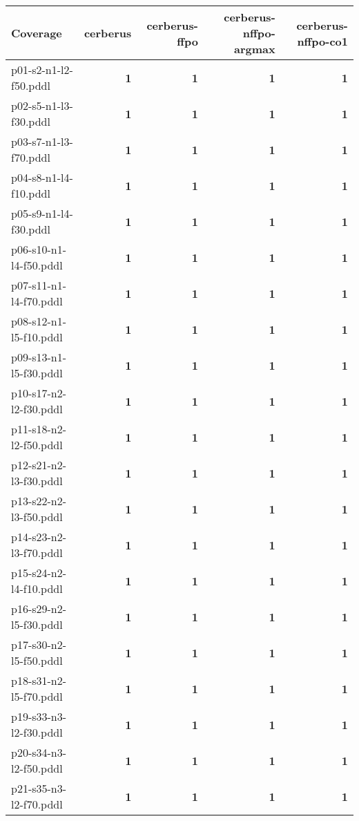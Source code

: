 \documentclass{article}
\begin{document}
\begin{tabular}{@{}lrrrr@{}}
Coverage & cerberus & cerberus-ffpo & cerberus-nffpo-argmax & cerberus-nffpo-co1 \\
\midrule
p01-s2-n1-l2-f50.pddl & \textbf{1} & \textbf{1} & \textbf{1} & \textbf{1} \\
p02-s5-n1-l3-f30.pddl & \textbf{1} & \textbf{1} & \textbf{1} & \textbf{1} \\
p03-s7-n1-l3-f70.pddl & \textbf{1} & \textbf{1} & \textbf{1} & \textbf{1} \\
p04-s8-n1-l4-f10.pddl & \textbf{1} & \textbf{1} & \textbf{1} & \textbf{1} \\
p05-s9-n1-l4-f30.pddl & \textbf{1} & \textbf{1} & \textbf{1} & \textbf{1} \\
p06-s10-n1-l4-f50.pddl & \textbf{1} & \textbf{1} & \textbf{1} & \textbf{1} \\
p07-s11-n1-l4-f70.pddl & \textbf{1} & \textbf{1} & \textbf{1} & \textbf{1} \\
p08-s12-n1-l5-f10.pddl & \textbf{1} & \textbf{1} & \textbf{1} & \textbf{1} \\
p09-s13-n1-l5-f30.pddl & \textbf{1} & \textbf{1} & \textbf{1} & \textbf{1} \\
p10-s17-n2-l2-f30.pddl & \textbf{1} & \textbf{1} & \textbf{1} & \textbf{1} \\
p11-s18-n2-l2-f50.pddl & \textbf{1} & \textbf{1} & \textbf{1} & \textbf{1} \\
p12-s21-n2-l3-f30.pddl & \textbf{1} & \textbf{1} & \textbf{1} & \textbf{1} \\
p13-s22-n2-l3-f50.pddl & \textbf{1} & \textbf{1} & \textbf{1} & \textbf{1} \\
p14-s23-n2-l3-f70.pddl & \textbf{1} & \textbf{1} & \textbf{1} & \textbf{1} \\
p15-s24-n2-l4-f10.pddl & \textbf{1} & \textbf{1} & \textbf{1} & \textbf{1} \\
p16-s29-n2-l5-f30.pddl & \textbf{1} & \textbf{1} & \textbf{1} & \textbf{1} \\
p17-s30-n2-l5-f50.pddl & \textbf{1} & \textbf{1} & \textbf{1} & \textbf{1} \\
p18-s31-n2-l5-f70.pddl & \textbf{1} & \textbf{1} & \textbf{1} & \textbf{1} \\
p19-s33-n3-l2-f30.pddl & \textbf{1} & \textbf{1} & \textbf{1} & \textbf{1} \\
p20-s34-n3-l2-f50.pddl & \textbf{1} & \textbf{1} & \textbf{1} & \textbf{1} \\
p21-s35-n3-l2-f70.pddl & \textbf{1} & \textbf{1} & \textbf{1} & \textbf{1} \\

\end{tabular}
\end{document}
